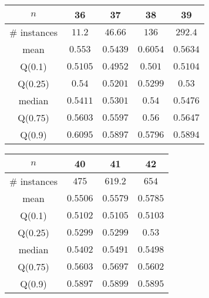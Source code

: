 \begin{tabular}{c|cccc} 
\hline 
$n$ & 36 & 37 & 38 & 39 \tabularnewline 
\hline 
\hline 
\# instances & $11.2$ & $46.66$ & $136$ & $292.4$ \tabularnewline 
mean & $0.553$ & $0.5439$ & $0.6054$ & $0.5634$ \tabularnewline 
Q(0.1) & $0.5105$ & $0.4952$ & $0.501$ & $0.5104$ \tabularnewline 
Q(0.25) & $0.54$ & $0.5201$ & $0.5299$ & $0.53$ \tabularnewline 
median & $0.5411$ & $0.5301$ & $0.54$ & $0.5476$ \tabularnewline 
Q(0.75) & $0.5603$ & $0.5597$ & $0.56$ & $0.5647$ \tabularnewline 
Q(0.9) & $0.6095$ & $0.5897$ & $0.5796$ & $0.5894$ \tabularnewline 
\hline 
\end{tabular} 
\medskip{} 

\begin{tabular}{c|ccc} 
\hline 
$n$ & 40 & 41 & 42 \tabularnewline 
\hline 
\hline 
\# instances & $475$ & $619.2$ & $654$ \tabularnewline 
mean & $0.5506$ & $0.5579$ & $0.5785$ \tabularnewline 
Q(0.1) & $0.5102$ & $0.5105$ & $0.5103$ \tabularnewline 
Q(0.25) & $0.5299$ & $0.5299$ & $0.53$ \tabularnewline 
median & $0.5402$ & $0.5491$ & $0.5498$ \tabularnewline 
Q(0.75) & $0.5603$ & $0.5697$ & $0.5602$ \tabularnewline 
Q(0.9) & $0.5897$ & $0.5899$ & $0.5895$ \tabularnewline 
\hline 
\end{tabular} 
\medskip{} 

